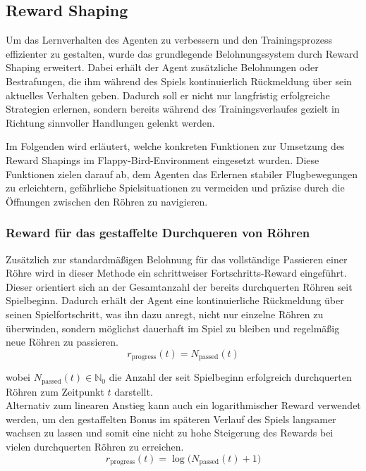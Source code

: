 \documentclass[conference]{IEEEtran}
\begin{document}
\subsection{Reward Shaping}\label{reward_shaping}
Um das Lernverhalten des Agenten zu verbessern und den Trainingsprozess effizienter zu gestalten, wurde das grundlegende Belohnungssystem durch Reward Shaping erweitert. Dabei erhält der Agent zusätzliche Belohnungen oder Bestrafungen, die ihm während des Spiels kontinuierlich Rückmeldung über sein aktuelles Verhalten geben. Dadurch soll er nicht nur langfristig erfolgreiche Strategien erlernen, sondern bereits während des Trainingsverlaufes gezielt in Richtung sinnvoller Handlungen gelenkt werden.

Im Folgenden wird erläutert, welche konkreten Funktionen zur Umsetzung des Reward Shapings im Flappy-Bird-Environment eingesetzt wurden. Diese Funktionen zielen darauf ab, dem Agenten das Erlernen stabiler Flugbewegungen zu erleichtern, gefährliche Spielsituationen zu vermeiden und präzise durch die Öffnungen zwischen den Röhren zu navigieren.\\

\subsubsection{Reward für das gestaffelte Durchqueren von Röhren}\label{reward_shaping_first}
Zusätzlich zur standardmäßigen Belohnung für das vollständige Passieren einer Röhre wird in dieser Methode ein schrittweiser Fortschritts-Reward eingeführt. Dieser orientiert sich an der Gesamtanzahl der bereits durchquerten Röhren seit Spielbeginn. Dadurch erhält der Agent eine kontinuierliche Rückmeldung über seinen Spielfortschritt, was ihn dazu anregt, nicht nur einzelne Röhren zu überwinden, sondern möglichst dauerhaft im Spiel zu bleiben und regelmäßig neue Röhren zu passieren.
\begin{equation}
	r_{\text{progress}}(t) = N_{\text{passed}}(t)
\end{equation}

wobei \( N_{\text{passed}}(t) \in \mathbb{N}_0 \) die Anzahl der seit Spielbeginn erfolgreich durchquerten Röhren zum Zeitpunkt \( t \) darstellt.\\

Alternativ zum linearen Anstieg kann auch ein logarithmischer Reward verwendet werden, um den gestaffelten Bonus im späteren Verlauf des Spiels langsamer wachsen zu lassen und somit eine nicht zu hohe Steigerung des Rewards bei vielen durchquerten Röhren zu erreichen.
\begin{equation}
	r_{\text{progress}}(t) = \log\big(N_{\text{passed}}(t) + 1\big)
\end{equation}
\end{document}
